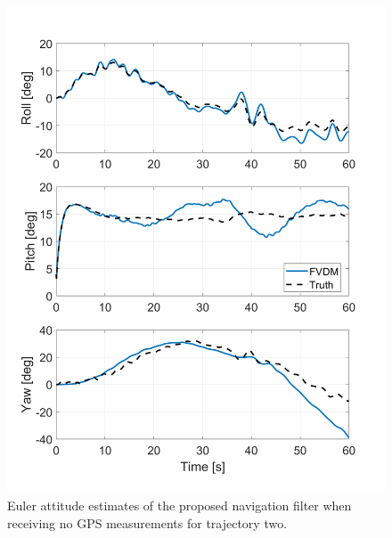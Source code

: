 \documentclass[12pt]{report}
\begin{document}
\begin{figure}[!ht]
  \centering
  \includegraphics[width=0.6\linewidth]{Figures/NOGPS/EUL.png}
  \caption{Euler attitude estimates of the proposed navigation filter when receiving no GPS measurements for trajectory two.}\label{fig:NOGPSEUL}
\end{figure}
\end{document}
